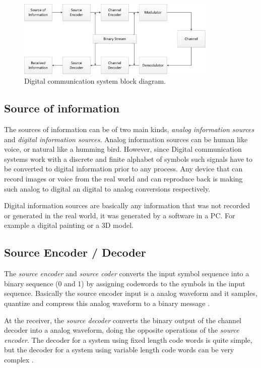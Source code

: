 \begin{figure}[htbp]
    \centering
    \includegraphics[width=0.85\textwidth]{./figures/digicom_bd}
    \caption{ Digital communication system block diagram.
    \label{fig:digcombd}}
\end{figure}

\subsection{Source of information}

The sources of information can be of two main kinds, \emph{analog information
sources} and \emph{digital information sources}. Analog information sources can
be human like voice, or natural like a humming bird. However, since Digital
communication systems work with a discrete and finite alphabet of symbols such
signals have to be converted to digital information prior to any process. Any
device that can record images or voice from the real world and can reproduce
back is making such analog to digital an digital to analog conversions
respectively.

Digital information sources are basically any information that was not
recorded or generated in the real world, it was generated by a software in a
PC. For example a digital painting or a 3D model.

\subsection{Source Encoder / Decoder}

The \emph{source encoder}  and \emph{source coder} converts the input symbol
sequence into a binary sequence (0 and 1) by assigning codewords to the symbols
in the input sequence. Basically the source encoder input is a analog waveform
and it samples, quantize and compress this analog waveform to a binary message
\cite{ocw:digicomm}.

At the receiver, the \emph{source decoder} converts the binary output of the
channel decoder into a analog waveform, doing the opposite operations of the
\emph{source encoder}. The decoder for a system using fixed length code words is
quite simple, but the decoder for a system using variable length code words can
be very complex \cite{ocw:digicomm}.

